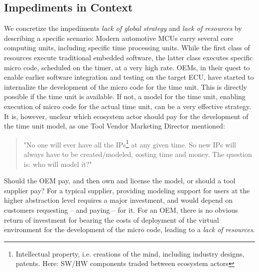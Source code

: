 \subsection{Impediments in Context}
We concretize the impediments 
\emph{lack of global strategy} and \emph{lack of resources}
by describing a specific scenario:
Modern automotive MCUs carry several core computing units, including specific time processing units.
While the first class of resources execute traditional embedded software, the latter class executes specific micro code, scheduled on the timer, at a very high rate.
OEMs, in their quest to enable earlier software integration and testing on the target ECU, have started to internalize the development of the micro code for the time unit.
This is directly possible if the time unit is available.
If not, a model for the time unit, enabling execution of micro code for the actual time unit, can be a very effective strategy.
It is, however, unclear which ecosystem actor should pay for the development of the time unit model, as one Tool Vendor Marketing Director mentioned: 

\begin{quote}
"No one will ever have all the IPs\footnote{Intellectual property, i.e. creations of the mind, including industry designs, patents. Here: SW/HW components traded between ecosystem actors} at any given time. So new IPs will always have to be created/modeled, costing time and money. The question is: who will model it?"
\end{quote}

Should the OEM pay, and then own and license the model, or should a tool supplier pay?
For a typical supplier, providing modeling support for users at the higher  abstraction level requires a major investment, and would depend on customers requesting -- and paying -- for it.
For an OEM, there is no obvious return of investment for bearing the costs of deployment of the virtual environment for the development of the micro code, leading to a \emph{lack of resources}.


